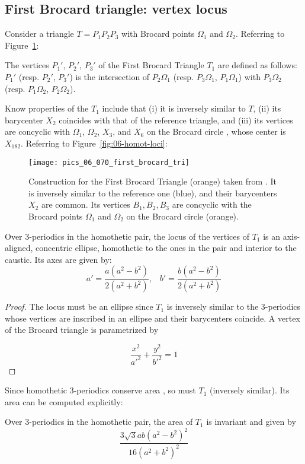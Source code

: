 \subsection{First Brocard triangle: vertex locus}

Consider a triangle $T=P_1 P_2  P_3 $ with Brocard points $\Omega_1$ and $\Omega_2$. Referring to Figure~\ref{fig:06-first-broc-tri}:

\begin{definition}
The vertices $P_1'$, $P_2'$, $P_3'$ of the First Brocard Triangle $T_1$ are defined as follows: $P_1'$ (resp. $P_2'$, $P_3'$) is the intersection of $P_2{\Omega_1}$ (resp. $P_3{\Omega_1}$, $P_1{\Omega_1}$) with $P_3{\Omega_2}$ (resp. $P_1{\Omega_2}$, $P_2{\Omega_2}$).
\end{definition}

Know properties of the $T_1$ include that (i) it is inversely similar to $T$, (ii) its barycenter $X_2$ coincides with that of the reference triangle, and (iii) its vertices are concyclic with $\Omega_1$, $\Omega_2$, $X_3$, and $X_6$ on the Brocard circle \cite[Brocard Circle]{mw}, whose center is $X_{182}$. Referring to Figure~\ref{fig:06-homot-loci}:

\begin{figure}
    \centering
    \texttt{[image: pics\_06\_070\_first\_brocard\_tri]}
    \caption{Construction for the First Brocard Triangle (orange) taken from \cite[First Brocard Triangle]{mw}. It is inversely similar to the reference one (blue), and their barycenters $X_2$ are common. Its vertices $B_1,B_2,B_3$ are concyclic with the Brocard points $\Omega_1$ and $\Omega_2$ on the Brocard circle (orange).}
    \label{fig:06-first-broc-tri}
\end{figure}

\begin{proposition}
Over 3-periodics in the homothetic pair, the locus of the vertices of $T_1$ is an axis-aligned, concentric ellipse, homothetic to the ones in the pair and interior to the caustic. Its axes are given by: 
\[ a'=\frac{a(a^2-b^2)}{2(a^2+b^2)},\;\;\; b'=\frac{b(a^2-b^2)}{2(a^2+b^2)}\]
\end{proposition}

\begin{proof}
The locus must be an ellipse since $T_1$ is inversely similar to the 3-periodics whose vertices are inscribed in an ellipse and their barycenters coincide. A vertex of the Brocard triangle is parametrized by

\[ \frac{x^2}{a'^2}+\frac{y^2}{b'^2} = 1 \]
\end{proof}

Since homothetic 3-periodics conserve area \cite{reznik2020-similarityII}, so must $T_1$ (inversely similar). Its area can be computed explicitly:

\begin{proposition}
Over 3-periodics in the homothetic pair, the area of $T_1$ is invariant and given by
\[ {\frac {3\sqrt{3} ab\left( {a}^{2}-{b}^{2} \right) ^{2}  }{16
 \left( {a}^{2}+{b}^{2} \right) ^{2}}}
\]
\end{proposition}





